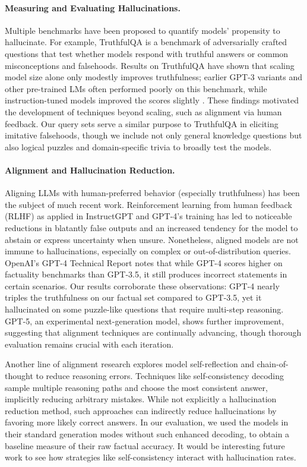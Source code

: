 \documentclass{article}
\begin{document}
\paragraph{Measuring and Evaluating Hallucinations.}
Multiple benchmarks have been proposed to quantify models' propensity to hallucinate. For example, TruthfulQA \cite{lin2022truthfulqa} is a benchmark of adversarially crafted questions that test whether models respond with truthful answers or common misconceptions and falsehoods. Results on TruthfulQA have shown that scaling model size alone only modestly improves truthfulness; earlier GPT-3 variants and other pre-trained LMs often performed poorly on this benchmark, while instruction-tuned models improved the scores slightly \cite{openai2023gpt4}. These findings motivated the development of techniques beyond scaling, such as alignment via human feedback. Our query sets serve a similar purpose to TruthfulQA in eliciting imitative falsehoods, though we include not only general knowledge questions but also logical puzzles and domain-specific trivia to broadly test the models.

\paragraph{Alignment and Hallucination Reduction.}
Aligning LLMs with human-preferred behavior (especially truthfulness) has been the subject of much recent work. Reinforcement learning from human feedback (RLHF) as applied in InstructGPT \cite{ouyang2022instruct} and GPT-4's training \cite{openai2023gpt4} has led to noticeable reductions in blatantly false outputs and an increased tendency for the model to abstain or express uncertainty when unsure. Nonetheless, aligned models are not immune to hallucinations, especially on complex or out-of-distribution queries. OpenAI's GPT-4 Technical Report \cite{openai2023gpt4} notes that while GPT-4 scores higher on factuality benchmarks than GPT-3.5, it still produces incorrect statements in certain scenarios. Our results corroborate these observations: GPT-4 nearly triples the truthfulness on our factual set compared to GPT-3.5, yet it hallucinated on some puzzle-like questions that require multi-step reasoning. GPT-5, an experimental next-generation model, shows further improvement, suggesting that alignment techniques are continually advancing, though thorough evaluation remains crucial with each iteration.

Another line of alignment research explores model self-reflection and chain-of-thought to reduce reasoning errors. Techniques like self-consistency decoding \cite{wang2023selfconsistency} sample multiple reasoning paths and choose the most consistent answer, implicitly reducing arbitrary mistakes. While not explicitly a hallucination reduction method, such approaches can indirectly reduce hallucinations by favoring more likely correct answers. In our evaluation, we used the models in their standard generation modes without such enhanced decoding, to obtain a baseline measure of their raw factual accuracy. It would be interesting future work to see how strategies like self-consistency interact with hallucination rates.
\end{document}
